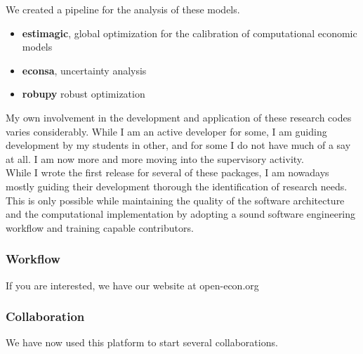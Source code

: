 We created a pipeline for the analysis of these models.

\begin{itemize}
\item \textbf{estimagic}, global optimization for the calibration of computational economic models
\item \textbf{econsa}, uncertainty analysis
\item \textbf{robupy} robust optimization
\end{itemize}

\noindent My own involvement in the development and application of these research codes varies considerably. While I am an active developer for some, I am guiding development by my students in other, and for some I do not have much of a say at all. I am now more and more moving into the supervisory activity.\\

\noindent While I wrote the first release for several of these packages, I am nowadays mostly guiding their development thorough the identification of research needs. This is only possible while maintaining the quality of the software architecture and the computational implementation by adopting a sound software engineering workflow and training capable contributors.

\subsubsection*{Workflow}


If you are interested, we have our website at open-econ.org


\subsubsection*{Collaboration}
We have now used this platform to start several collaborations.
